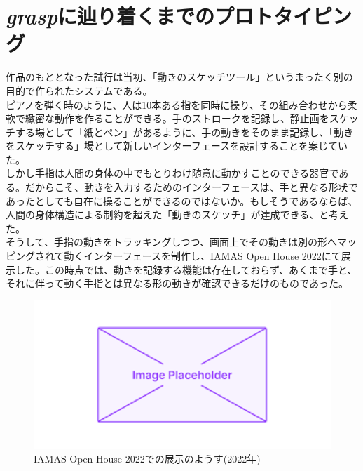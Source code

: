 \section{\textit{grasp}に辿り着くまでのプロトタイピング}
\label{prototyping_concept_making}
作品のもととなった試行は当初、「動きのスケッチツール」というまったく別の目的で作られたシステムである。\\
ピアノを弾く時のように、人は10本ある指を同時に操り、その組み合わせから柔軟で緻密な動作を作ることができる。手のストロークを記録し、静止画をスケッチする場として「紙とペン」があるように、手の動きをそのまま記録し、「動きをスケッチする」場として新しいインターフェースを設計することを案じていた。\\
しかし手指は人間の身体の中でもとりわけ随意に動かすことのできる器官である。だからこそ、動きを入力するためのインターフェースは、手と異なる形状であったとしても自在に操ることができるのではないか。もしそうであるならば、人間の身体構造による制約を超えた「動きのスケッチ」が達成できる、と考えた。\\
そうして、手指の動きをトラッキングしつつ、画面上でその動きは別の形へマッピングされて動くインターフェースを制作し、IAMAS Open House 2022にて展示した。この時点では、動きを記録する機能は存在しておらず、あくまで手と、それに伴って動く手指とは異なる形の動きが確認できるだけのものであった。\\

\begin{figure}[H]
  \centering
  \includegraphics[width=15cm]{img/placeholder.png}
  \caption{IAMAS Open House 2022での展示のようす(2022年)}
  \label{fig:exhibit_2022}
\end{figure}

